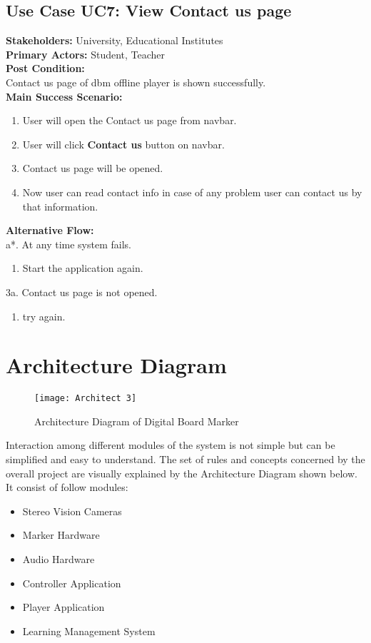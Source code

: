 \subsection{Use Case UC7: View Contact us page}
\textbf{Stakeholders: } University, Educational Institutes \\
\textbf{Primary Actors: } Student, Teacher \\
\textbf{Post Condition: }\\
Contact us page of dbm offline player is shown successfully.\\
\textbf{Main Success Scenario: }
\begin{enumerate}
\item User will open the Contact us page from navbar.
\item User will click \textbf{Contact us} button on navbar.
\item Contact us page will be opened.
\item Now user can read contact info in case of any problem user can contact us by that information.

\end{enumerate}
\textbf{Alternative Flow: }\\
a*. At any time system fails.
\begin{enumerate}
\item Start the application again.
\end{enumerate}
3a. Contact us page is not opened.
\begin{enumerate}
\item try again.
\end{enumerate}



\section{Architecture Diagram}
\begin{figure}[h]
  \centering
  \texttt{[image: Architect 3]}
  \caption{Architecture Diagram of Digital Board Marker}
\end{figure}

Interaction among different modules of the system is not simple but can be simplified and easy to understand. The set of rules and concepts concerned by the overall project are visually explained by the Architecture Diagram shown below.
It consist of follow modules:
\begin{itemize}

\item Stereo Vision Cameras
\item Marker Hardware
\item Audio Hardware
\item Controller Application
\item Player Application
\item Learning Management System

\end{itemize}



